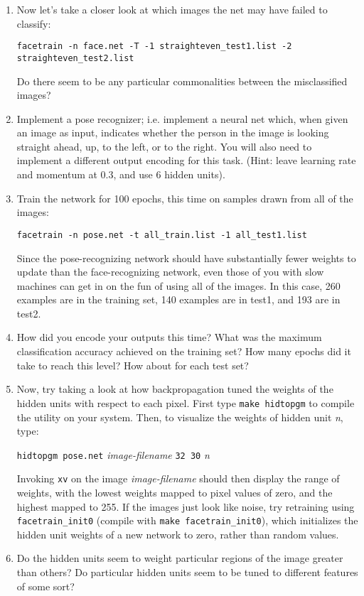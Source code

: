\begin{enumerate}
\item Now let's take a closer look at which images the net may have failed
to classify:

{\tt facetrain -n face.net -T -1 straighteven\_test1.list -2 straighteven\_test2.list}

Do there seem to be any particular commonalities between the misclassified
images?

\item Implement a pose recognizer; i.e. implement a neural net which,
when given an image as input, indicates whether the person in the image
is looking straight ahead, up, to the left, or to the right.  You
will also need to implement a different output encoding for this task.
(Hint: leave learning rate and momentum at
0.3, and use 6 hidden units).

\item Train the network for 100 epochs, this time on samples drawn
from all of the images:

{\tt facetrain -n pose.net -t all\_train.list -1 all\_test1.list}

Since the pose-recognizing network should have substantially fewer weights to
update than the face-recognizing network, even those of you with slow machines
can get in on the fun of using all of the images.  In this case, 260 examples
are in the training set, 140 examples are in test1, and 193 are in test2.

\item How did you encode your outputs this time?
What was the maximum classification accuracy achieved on the training set?
How many epochs did it take to reach this level?  How about for each test set?

\item Now, try taking a look at how backpropagation tuned the weights
of the hidden units with respect to each pixel.  First type {\tt make
hidtopgm} to compile the utility on your system.  Then, to visualize the
weights of hidden unit {\it n}, type:

{\tt hidtopgm pose.net} {\it image-filename} {\tt 32 30} {\it n}

Invoking {\tt xv} on the image {\it image-filename} 
should then display the range of weights,
with the lowest weights mapped to pixel values of zero, and the highest
mapped to 255.  If the images just look like noise, try retraining using
{\tt facetrain\_init0} (compile with {\tt make facetrain\_init0}), which
initializes the hidden unit weights of a new network to zero, rather
than random values.

\item Do the hidden units seem to weight particular regions of the image
greater than others?  Do particular hidden units seem to be tuned
to different features of some sort?

\end{enumerate}

